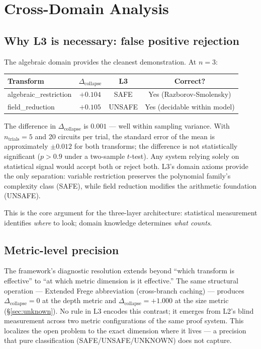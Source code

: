 \documentclass[11pt,a4paper]{article}
\newcommand{\Dcollapse}{\Delta_{\mathrm{collapse}}}
\begin{document}
\section{Cross-Domain Analysis}
\label{sec:cross}

\subsection{Why L3 is necessary: false positive rejection}

The algebraic domain provides the cleanest demonstration. At $n=3$:

\begin{center}
\begin{tabular}{@{}lccc@{}}
\toprule
Transform & $\Dcollapse$ & L3 & Correct? \\
\midrule
algebraic\_restriction & $+0.104$ & SAFE & Yes (Razborov-Smolensky) \\
field\_reduction & $+0.105$ & UNSAFE & Yes (decidable within model) \\
\bottomrule
\end{tabular}
\end{center}

The difference in $\Dcollapse$ is $0.001$ --- well within sampling variance. With $n_{\mathrm{trials}} = 5$ and 20 circuits per trial, the standard error of the mean is approximately $\pm 0.012$ for both transforms; the difference is not statistically significant ($p > 0.9$ under a two-sample $t$-test). Any system relying solely on statistical signal would accept both or reject both. L3's domain axioms provide the only separation: variable restriction preserves the polynomial family's complexity class (SAFE), while field reduction modifies the arithmetic foundation (UNSAFE).

This is the core argument for the three-layer architecture: statistical measurement identifies \emph{where} to look; domain knowledge determines \emph{what counts}.

\subsection{Metric-level precision}

The framework's diagnostic resolution extends beyond ``which transform is effective'' to ``at which metric dimension is it effective.'' The same structural operation --- Extended Frege abbreviation (cross-branch caching) --- produces $\Dcollapse = 0$ at the depth metric and $\Dcollapse = +1.000$ at the size metric (\S\ref{sec:unknown}). No rule in L3 encodes this contrast; it emerges from L2's blind measurement across two metric configurations of the same proof system. This localizes the open problem to the exact dimension where it lives --- a precision that pure classification (SAFE/UNSAFE/UNKNOWN) does not capture.
\end{document}
